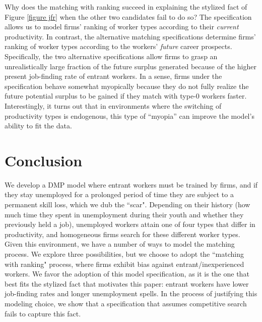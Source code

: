 \documentclass[12pt]{article} %
\theoremstyle{definition}
\begin{document}
Why does the \cite{petrongolo2001looking} matching with ranking succeed in explaining the stylized fact of Figure \ref{figure jfr} when the other two candidates fail to do so?
The \cite{petrongolo2001looking} specification allows us to model firms' ranking of worker types according to their \textit{current} productivity. 
In contrast, the alternative matching specifications
determine firms' ranking of worker types according to the workers' \textit{future} career prospects.
Specifically, the two alternative specifications allow firms to grasp an unrealistically large fraction of the future surplus generated because of the higher present job-finding rate of entrant workers.  
In a sense, firms under the \cite{petrongolo2001looking} specification behave somewhat myopically because they do not fully realize the future potential surplus to be gained if they match with type-0 workers faster. 
Interestingly, it turns out that in environments where the switching of productivity types is endogenous, this type of ``myopia'' can improve the model's ability to fit the data. 


\section{Conclusion}\label{section conclusion} 

We develop a DMP model where entrant workers must be trained by firms, and if they stay unemployed for a prolonged period of time they are subject to a permanent skill loss, which we dub the ``scar". Depending on their history (how much time they spent in unemployment during their youth and whether they previously held a job), unemployed workers attain one of four types that differ in productivity, and homogeneous firms search for these different worker types. Given this environment, we have a number of ways to model the matching process. We explore three possibilities, but we choose to adopt the \cite{petrongolo2001looking} ``matching with ranking" process, where firms exhibit bias against entrant/inexperienced workers. We favor the adoption of this model specification, as it is the one that best fits the stylized fact that motivates this paper: entrant workers have lower job-finding rates and longer unemployment spells. In the process of justifying this modeling choice, we show that a specification that assumes competitive search fails to capture this fact. 
\end{document}
